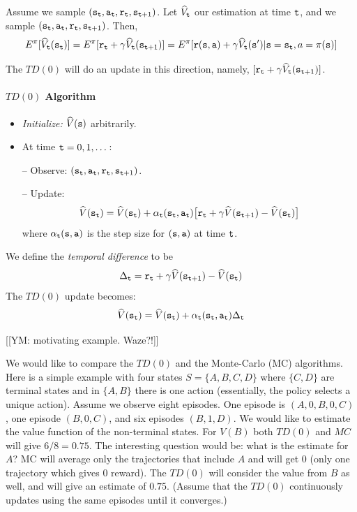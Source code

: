 Assume we sample
$({\tt s}_{\tt t},{\tt a}_{\tt t},{\tt r}_{\tt t},{\tt s}_{{\tt t}+1})$.
Let $\widehat{V}_{\tt t}$ our estimation at time ${\tt t}$,
and we sample
$({\tt s}_{\tt t},{\tt a}_{\tt t},{\tt r}_{\tt t},{\tt s}_{{\tt t}+1})$.
Then,
\[
E^\pi[\widehat{V}_{\tt t}({\tt s}_{\tt t})]=
E^\pi[{\tt r}_{\tt t}+\gamma
\widehat{V}_{\tt t}({\tt s}_{{\tt t}+1})]=E^\pi[{\tt r}({\tt s},{\tt a})+\gamma
\widehat{V}_{\tt t}({\tt s}')|{\tt s}={\tt s}_{\tt t},a=\pi({\tt s})]
\]

The $TD(0)$ will do an update in this direction, namely,
$[{\tt r}_{\tt t}+\gamma \widehat{V}_{\tt t}({\tt s}_{{\tt t}+1})]$.

\paragraph{$TD(0)$ Algorithm}

\begin{itemize}
\item \emph{Initialize:} $\widehat{V}({\tt s})$ arbitrarily.

\item At time ${\tt t}=0,1,\dots$:


-- Observe: $({\tt s}_{\tt t}, {\tt a}_{\tt t}, {\tt r}_{\tt t},
{\tt s}_{{\tt t}+1})$.

-- Update:
\[
\widehat{V}({\tt s}_{\tt t})=\widehat{V}({\tt s}_{\tt t})+\alpha_{\tt t}({\tt s}_{\tt t},{\tt a}_{\tt t})
\big[{\tt r}_{\tt t}+\gamma
\widehat{V}({\tt s}_{{\tt t}+1})-\widehat{V}({\tt s}_{\tt t})\big]
\]
where $\alpha_{\tt t}({\tt s},{\tt a})$ is the step size for
$({\tt s},{\tt a})$ at time ${\tt t}$.
\end{itemize}

We define the {\em temporal difference} to be
\[
\Delta_{\tt t} ={\tt r}_{\tt t}+\gamma
\widehat{V}({\tt s}_{{\tt t}+1})-\widehat{V}({\tt s}_{\tt t})
\]
The $TD(0)$ update becomes:
\[
\widehat{V}({\tt s}_{\tt t})=\widehat{V}({\tt s}_{\tt t})+\alpha_{\tt t}({\tt s}_{\tt t},{\tt a}_{\tt t})\Delta_{\tt t}
\]


[[YM: motivating example. Waze?!]]

We would like to compare the $TD(0)$ and the Monte-Carlo (MC)
algorithms. Here is a simple example with four states
$S=\{A,B,C,D\}$ where $\{C,D\}$ are terminal states and in $\{A,B\}$
there is one action (essentially, the policy selects a unique
action). Assume we observe eight episodes. One episode is
$(A,0,B,0,C)$, one episode $(B,0,C)$, and six episodes $(B,1,D)$. We
would like to estimate the value function of the non-terminal
states. For $V(B)$ both $TD(0)$ and $MC$ will give $6/8=0.75$. The
interesting question would be: what is the estimate for $A$? MC will
average only the trajectories that include $A$ and will get $0$
(only one trajectory which gives $0$ reward). The $TD(0)$ will
consider the value from $B$ as well, and will give an estimate of
$0.75$. (Assume that the $TD(0)$ continuously updates using the same
episodes until it converges.)

